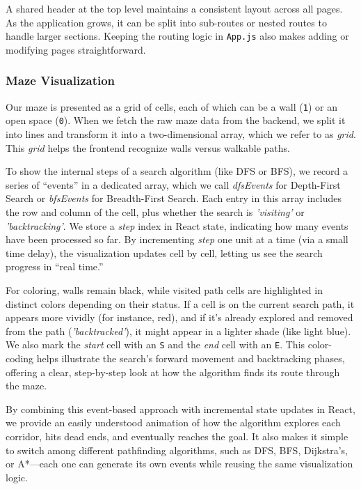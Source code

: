 \documentclass[12pt,a4paper]{article}
\begin{document}
A shared header at the top level maintains a consistent layout across all pages. As the application grows, it can be split into sub-routes or nested routes to handle larger sections. Keeping the routing logic in \texttt{App.js} also makes adding or modifying pages straightforward.

    \subsubsection{Maze Visualization}

Our maze is presented as a grid of cells, each of which can be a wall 
(\texttt{1}) or an open space (\texttt{0}). When we fetch the raw maze data 
from the backend, we split it into lines and transform it into a 
two-dimensional array, which we refer to as \emph{grid}. This \emph{grid} 
helps the frontend recognize walls versus walkable paths.

To show the internal steps of a search algorithm (like DFS or BFS), we record 
a series of “events” in a dedicated array, which we call \emph{dfsEvents} 
for Depth-First Search or \emph{bfsEvents} for Breadth-First Search. Each 
entry in this array includes the row and column of the cell, plus whether 
the search is \emph{'visiting'} or \emph{'backtracking'}. We store a 
\emph{step} index in React state, indicating how many events have been 
processed so far. By incrementing \emph{step} one unit at a time (via a 
small time delay), the visualization updates cell by cell, letting us see 
the search progress in “real time.”

For coloring, walls remain black, while visited path cells are highlighted 
in distinct colors depending on their status. If a cell is on the current 
search path, it appears more vividly (for instance, red), and if it’s 
already explored and removed from the path (\emph{'backtracked'}), it might 
appear in a lighter shade (like light blue). We also mark the \emph{start} 
cell with an \texttt{S} and the \emph{end} cell with an \texttt{E}. This 
color-coding helps illustrate the search’s forward movement and backtracking 
phases, offering a clear, step-by-step look at how the algorithm finds its 
route through the maze. 

By combining this event-based approach with incremental state updates in 
React, we provide an easily understood animation of how the algorithm 
explores each corridor, hits dead ends, and eventually reaches the goal. 
It also makes it simple to switch among different pathfinding algorithms, 
such as DFS, BFS, Dijkstra’s, or A*—each one can generate its own events 
while reusing the same visualization logic.
\end{document}
